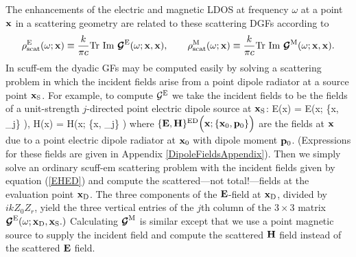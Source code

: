 \documentclass[letterpaper]{article}
\begin{document}
The enhancements of the electric and magnetic LDOS at frequency $\omega$
at a point $\mathbf{x}$ in a scattering geometry are related to these
scattering DGFs according to
$$ \rho^{\text{\scriptsize E}}_{\text{\scriptsize scat}}(\omega; \mathbf{x})
   \equiv
   \frac{k}{\pi c}\text{Tr }\text{Im } \boldsymbol{\mathcal{G}}^{\text{\scriptsize E}}(\omega; \mathbf{x}, \mathbf{x}),
   \qquad
   \rho^{\text{\scriptsize M}}_{\text{\scriptsize scat}}(\omega; \mathbf{x})
   \equiv
   \frac{k}{\pi c}\text{Tr }\text{Im } \boldsymbol{\mathcal{G}}^{\text{\scriptsize M}}(\omega; \mathbf{x}, \mathbf{x}).
$$
In {\sc scuff-em} the dyadic GFs may be computed easily by solving a
scattering problem in which the incident fields arise from a point dipole
radiator at a source point $\mathbf{x}_{\text{\scriptsize S}}$.
For example, to compute $\mathcal{G}^{\text{\scriptsize E}}$ we take the incident fields 
to be the fields of a unit-strength $j$-directed point electric dipole 
source at $\mathbf{x}_{\text{\scriptsize S}}$:
{
 \vb E(\vb x) =
 \vb E\Big(\vb x; \{\vb x, _j\} \Big),
 \qquad
 \vb H(\vb x) =
 \vb H\Big(\vb x; \{\vb x, _j\} \Big)
}
where $\{\mathbf{E}, \mathbf{H}\}^{\text{\scriptsize ED}}\Big(\mathbf{x}; \{\mathbf{x}_0, \mathbf{p}_0\}\Big)$
are the fields at $\mathbf{x}$ due to a point electric dipole radiator
at $\mathbf{x}_0$ with dipole moment $\mathbf{p}_0$.
(Expressions for these fields are given in 
Appendix \ref{DipoleFieldsAppendix}).
Then we simply solve an ordinary {\sc scuff-em} scattering
problem with the incident fields given by equation 
(\ref{EHED}) and compute the scattered---not total!---fields
at the evaluation point $\mathbf{x}_{\text{\scriptsize D}}$. The three components of the
$\mathbf{E}$-field at $\mathbf{x}_{\text{\scriptsize D}}$, divided by $ikZ_0 Z_r$, yield the
three vertical entries of the $j$th column of the
$3\times 3$ matrix 
$\boldsymbol{\mathcal{G}}^{\text{\scriptsize E}}(\omega; \mathbf{x}_{\text{\scriptsize D}}, \mathbf{x}_{\text{\scriptsize S}}.)$
Calculating $\boldsymbol{\mathcal{G}}^{\text{\scriptsize M}}$ is similar except that we use 
a point magnetic source to supply the incident field 
and compute the scattered $\mathbf{H}$ field instead of the 
scattered $\mathbf{E}$ field.

\newpage
\end{document}
